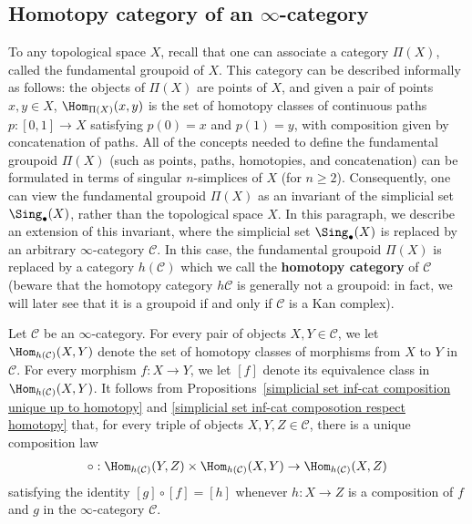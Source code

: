 \subsection{Homotopy category of an \texorpdfstring{$\infty$}{inf}-category}
To any topological space $X$, recall that one can associate a category $\Pi(X)$, called the fundamental groupoid of $X$. This category can be described informally as follows: the objects of $\Pi(X)$ are points of $X$, and given a pair of points $x,y\in X$, $\Hom_{\Pi(X)}(x,y)$ is the set of homotopy classes of continuous paths $p:[0,1]\to X$ satisfying $p(0)=x$ and $p(1)=y$, with composition given by concatenation of paths. All of the concepts needed to define the fundamental groupoid $\Pi(X)$ (such as points, paths, homotopies, and concatenation) can be formulated in terms of singular $n$-simplices of $X$ (for $n\geq 2$). Consequently, one can view the fundamental groupoid $\Pi(X)$ as an invariant of the simplicial set $\Sing_\bullet(X)$, rather than the topological space $X$. In this paragraph, we describe an extension of this invariant, where the simplicial set $\Sing_\bullet(X)$ is replaced by an arbitrary $\infty$-category $\mathcal{C}$. In this case, the fundamental groupoid $\Pi(X)$ is replaced by a category $h(\mathcal{C})$ which we call the \textbf{homotopy category} of $\mathcal{C}$ (beware that the homotopy category $h\mathcal{C}$ is generally not a groupoid: in fact, we will later see that it is a groupoid if and only if $\mathcal{C}$ is a Kan complex).\par
Let $\mathcal{C}$ be an $\infty$-category. For every pair of objects $X,Y\in\mathcal{C}$, we let $\Hom_{h(\mathcal{C})}(X,Y)$ denote the set of homotopy classes of morphisms from $X$ to $Y$ in $\mathcal{C}$. For every morphism $f:X\to Y$, we let $[f]$ denote its equivalence class in $\Hom_{h(\mathcal{C})}(X,Y)$. It follows from Propositions~\ref{simplicial set inf-cat composition unique up to homotopy} and \ref{simplicial set inf-cat composotion respect homotopy} that, for every triple of objects $X,Y,Z\in\mathcal{C}$, there is a unique composition law
\begin{align}\label{simplicial set inf-cat composition in homotopy cat}
\circ:\Hom_{h(\mathcal{C})}(Y,Z)\times\Hom_{h(\mathcal{C})}(X,Y)\to\Hom_{h(\mathcal{C})}(X,Z)
\end{align}
satisfying the identity $[g]\circ[f]=[h]$ whenever $h:X\to Z$ is a composition of $f$ and $g$ in the $\infty$-category $\mathcal{C}$.
